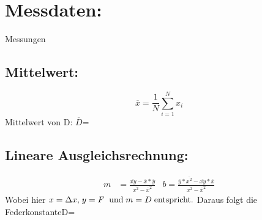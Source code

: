 \section{Messdaten:} 
    
\begin{table}
    \centering
    \caption{Messungen}
     
    
    \label{tab:data}
\end{table}
\newpage
    \subsection{Mittelwert:}
    \begin{equation}\label{eq.mean}
        \overline{x} = \frac{1}{N}\sum\limits_{i=1}^{N} x_i
    \end{equation}
    Mittelwert von D: $\overline{D}$\:=\:

    \subsection{Lineare Ausgleichsrechnung:}
    \begin{align}\label{eq.linreg}
        m &= \frac{\overline{xy}-\overline{x}* \overline{y}}{\overline{x^2}-\overline{x}^2} 
        &b = \frac{\overline{y}* \overline{x^2}-\overline{xy}* \overline{x}}{\overline{x^2}- \overline{x}^2}
    \end{align}
    Wobei hier$\; x = \Delta x \text{,} \; y=F \;\;\text{und}\; m = D \text{\;entspricht.}\\$
    Daraus folgt die Federkonstante\:D\:=\:

    
    

